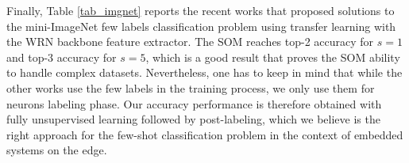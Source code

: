 \documentclass[runningheads]{llncs}
\begin{document}
\begin{table}[h]
\centering
\caption{mini-ImageNet few labels transfer learning with q = 15 (Q = 75): state of the art reported from \cite{hu2020accurate_few_shot}.}
\label{tab_imgnet}
\begin{center}
\end{center}
\end{table}

Finally, Table \ref{tab_imgnet} reports the recent works that proposed solutions to the mini-ImageNet few labels classification problem using transfer learning with the WRN backbone feature extractor. The SOM reaches top-2 accuracy for $s = 1$ and top-3 accuracy for $s = 5$, which is a good result that proves the SOM ability to handle complex datasets. 
Nevertheless, one has to keep in mind that while the other works use the few labels in the training process, we only use them for neurons labeling phase. Our accuracy performance is therefore obtained with fully unsupervised learning followed by post-labeling, which we believe is the right approach for the few-shot classification problem in the context of embedded systems on the edge.
\end{document}
